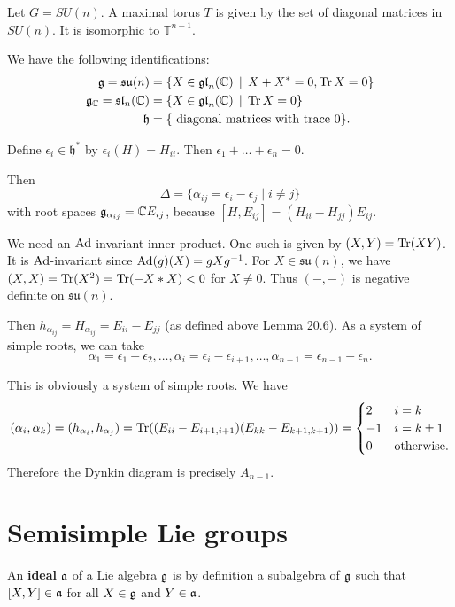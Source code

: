 \documentclass[11pt, english]{article}
\begin{document}
\begin{example}
Let $G = SU(n)$. A maximal torus $T$ is given by the set of diagonal matrices in $SU(n)$. It is isomorphic to $\mathbb T^{n-1}$.

We have the following identifications:
\begin{align*}
  \mathfrak g = \mathfrak{su}(n) &= \{ X \in \mathfrak{gl}_n(\mathbb{C}) \, \mid \, X + X^\ast = 0, \operatorname{Tr} X = 0 \} \\
\mathfrak g_{\mathbb{C}} = \mathfrak{sl}_n(\mathbb{C}) &= \{ X \in \mathfrak{gl}_n(\mathbb{C}) \, \mid \, \operatorname{Tr} X = 0 \} \\
\mathfrak h &=  \{ \text{ diagonal matrices with trace } 0 \}.
\end{align*}

Define $\epsilon_i \in \mathfrak h^\ast$ by $\epsilon_i(H)=H_{ii}$. Then $\epsilon_1+\ldots+\epsilon_n = 0$.

Then
$$
\Delta = \{ \alpha_{ij} = \epsilon_i-\epsilon_j \mid i \neq j \}
$$
with root spaces $\mathfrak g_{\alpha_{ij}} = \mathbb{C} E_{ij}$, because $[H,E_{ij}] = (H_{ii}-H_{jj})E_{ij}$. 

We need an $\operatorname{Ad}$-invariant inner product. One such is given by $(X,Y) =  \operatorname{Tr}(XY)$. It is $\operatorname{Ad}$-invariant since $\operatorname{Ad}(g)(X) = gXg^{-1}$. For $X \in \mathfrak{su}(n)$, we have $(X,X) = \operatorname{Tr}(X^2)= \operatorname{Tr}(-X\ast X ) < 0$ for $X \neq 0$. Thus $(-,-)$ is negative definite on $\mathfrak{su}(n)$. 

Then $h_{\alpha_{ij}}=H_{\alpha_{ij}}=E_{ii}-E_{jj}$ (as defined above Lemma 20.6). As a system of simple roots, we can take 
$$
\alpha_1 = \epsilon_1-\epsilon_2, \ldots, \alpha_i = \epsilon_i-\epsilon_{i+1}, \ldots, \alpha_{n-1}=\epsilon_{n-1}-\epsilon_n.
$$

This is obviously a system of simple roots. We have
$$
(\alpha_i,\alpha_k) = (h_{\alpha_i}, h_{\alpha_j}) = \operatorname{Tr}( (E_{ii}-E_{i+1,i+1})(E_{kk}-E_{k+1,k+1})) = \begin{cases}
2 & i=k \\
-1 & i=k \pm 1 \\
0 & \text{otherwise}.
\end{cases}
$$
Therefore the Dynkin diagram is precisely $A_{n-1}$.
\end{example}


\newpage
\section{Semisimple Lie groups}

An \textbf{ideal} $\mathfrak{a}$ of a Lie algebra $\mathfrak g$ is by definition a subalgebra of $\mathfrak g$ such that $[X,Y] \in \mathfrak{a}$ for all $X \in \mathfrak g$ and $Y \in \mathfrak{a}$. 
\end{document}
